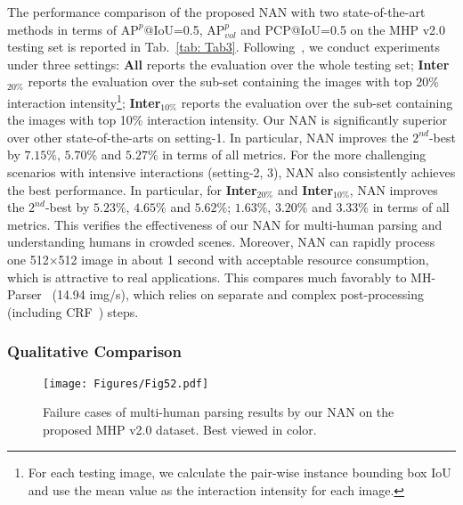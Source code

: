 \documentclass[10pt,twocolumn,letterpaper]{article}
\theoremstyle{definition}
\theoremstyle{remark}
\begin{document}
The performance comparison of the proposed NAN with two state-of-the-art methods in terms of $\mathrm{AP}^{p}$@IoU=0.5, $\mathrm{AP}^{p}_{vol}$ and PCP@IoU=0.5 on the MHP v2.0 testing set is reported in Tab.~\ref{tab: Tab3}. Following~\cite{li2017towards}, we conduct experiments under three settings: \textbf{All} reports the evaluation over the whole testing set; \textbf{Inter$_{20\%}$} reports the evaluation over the sub-set containing the images with top 20\% interaction intensity\footnote{For each testing image, we calculate the pair-wise instance bounding box IoU and use the mean value as the interaction intensity for each image.}; \textbf{Inter$_{10\%}$} reports the evaluation over the sub-set containing the images with top 10\% interaction intensity. Our NAN is significantly superior over other state-of-the-arts on setting-1. In particular, NAN improves the $2^{nd}$-best by $7.15\%$, $5.70\%$ and $5.27\%$ in terms of all metrics. For the more challenging scenarios with intensive interactions (setting-2, 3), NAN also consistently achieves the best performance. In particular, for \textbf{Inter$_{20\%}$} and \textbf{Inter$_{10\%}$}, NAN improves the $2^{nd}$-best by $5.23\%$, $4.65\%$ and $5.62\%$; $1.63\%$, $3.20\%$ and $3.33\%$ in terms of all metrics. This verifies the effectiveness of our NAN for multi-human parsing and understanding humans in crowded scenes. Moreover, NAN can rapidly process one 512$\times$512 image in about 1 second with acceptable resource consumption, which is attractive to real applications. This compares much favorably to MH-Parser~\cite{li2017towards} (14.94 img/s), which relies on separate and complex post-processing (including CRF~\cite{NIPS2011_4296}) steps.

\subsubsection{Qualitative Comparison}

\begin{figure}[t]
	\begin{center}
		\texttt{[image: Figures/Fig52.pdf]}
	\end{center}
	\vspace{-4mm}
	\small
	\caption{\small Failure cases of multi-human parsing results by our NAN on the proposed MHP v2.0 dataset. Best viewed in color.}
	\label{fig: Fig5_2}
	\vspace{-3mm}
\end{figure}
\end{document}
